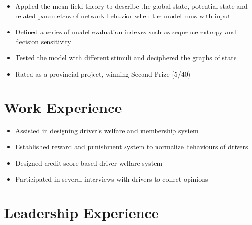 \documentclass{resume}
\begin{document}
\begin{itemize}
  \item Applied the mean field theory to describe the global state, potential state and related parameters of network behavior when the model runs with input
  \item Defined a series of model evaluation indexes such as sequence entropy and decision sensitivity
  \item Tested the model with different stimuli and deciphered the graphs of state 
  \item Rated as a provincial project, winning Second Prize (5/40)
\end{itemize}


\section{Work Experience}
\begin{itemize}
  \item Assisted in designing driver's welfare and membership system
  \item Established reward and punishment system to normalize behaviours of drivers
  \item Designed credit score based driver welfare system 
  \item Participated in several interviews with drivers to collect opinions 
\end{itemize}
\section{Leadership Experience}
\end{document}
